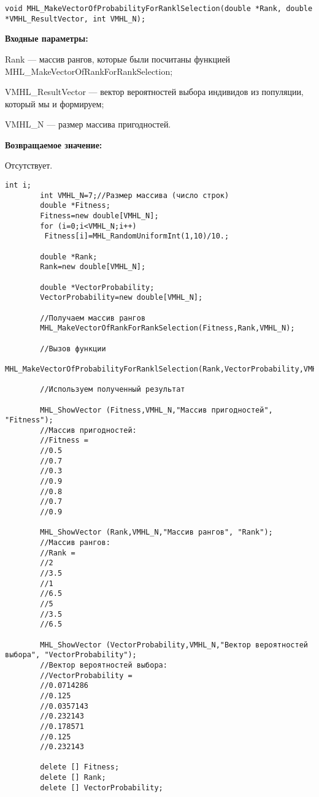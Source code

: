 \documentclass[a4paper,12pt]{article}
\begin{document}
\begin{lstlisting}[label=code_syntax_MHL_MakeVectorOfProbabilityForRanklSelection,caption=Синтаксис]
void MHL_MakeVectorOfProbabilityForRanklSelection(double *Rank, double *VMHL_ResultVector, int VMHL_N);
\end{lstlisting}

\textbf{Входные параметры:}  
 
Rank --- массив рангов, которые были посчитаны функцией MHL\_MakeVectorOfRankForRankSelection;
 
VMHL\_ResultVector --- вектор вероятностей выбора индивидов из популяции, который мы и формируем;
 
VMHL\_N --- размер массива пригодностей.

\textbf{Возвращаемое значение:}

 Отсутствует.


\begin{lstlisting}[label=code_use_MHL_MakeVectorOfProbabilityForRanklSelection,caption=Пример использования]
        int i;
        int VMHL_N=7;//Размер массива (число строк)
        double *Fitness;
        Fitness=new double[VMHL_N];
        for (i=0;i<VMHL_N;i++)
         Fitness[i]=MHL_RandomUniformInt(1,10)/10.;

        double *Rank;
        Rank=new double[VMHL_N];

        double *VectorProbability;
        VectorProbability=new double[VMHL_N];

        //Получаем массив рангов
        MHL_MakeVectorOfRankForRankSelection(Fitness,Rank,VMHL_N);

        //Вызов функции
        MHL_MakeVectorOfProbabilityForRanklSelection(Rank,VectorProbability,VMHL_N);

        //Используем полученный результат

        MHL_ShowVector (Fitness,VMHL_N,"Массив пригодностей", "Fitness");
        //Массив пригодностей:
        //Fitness =
        //0.5
        //0.7
        //0.3
        //0.9
        //0.8
        //0.7
        //0.9

        MHL_ShowVector (Rank,VMHL_N,"Массив рангов", "Rank");
        //Массив рангов:
        //Rank =
        //2
        //3.5
        //1
        //6.5
        //5
        //3.5
        //6.5

        MHL_ShowVector (VectorProbability,VMHL_N,"Вектор вероятностей выбора", "VectorProbability");
        //Вектор вероятностей выбора:
        //VectorProbability =
        //0.0714286
        //0.125
        //0.0357143
        //0.232143
        //0.178571
        //0.125
        //0.232143

        delete [] Fitness;
        delete [] Rank;
        delete [] VectorProbability;
\end{lstlisting}
\end{document}
